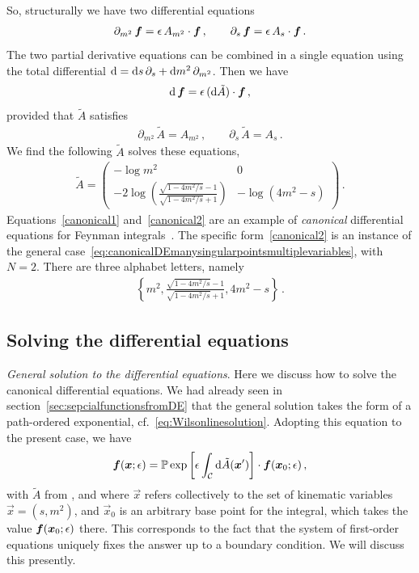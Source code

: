 So, structurally we have two differential equations 
\begin{align}
\partial_{m^2} \, \vec{f} = \eps\, A_{m^2} \cdot \vec{f} \,, \qquad
\partial_s \, \vec{f} = \eps\, A_{s} \cdot \vec{f} \,.
\end{align}
The two partial derivative equations can be combined in a single equation using the total differential $\mathrm{d} = \mathrm{d} s \, \partial_s + \mathrm{d}{m^2} \, \partial_{m^2}$.
Then we have
\begin{align}\label{canonical1}
\d \, \vec{f} =  \eps\,  (\d \tilde{A}) \cdot \vec{f} \,,
\end{align}
provided that $\tilde{A}$ satisfies
\begin{align}
\partial_{m^2} \, \tilde{A} = A_{m^2}  \,, \qquad
\partial_s \, \tilde{A} = A_{s}  \,.
\end{align}
We find the following $\tilde{A}$ solves these equations,
\begin{align}\label{canonical2}
\tilde{A} =   \begin{pmatrix}
-\log m^2 & 0 \\
-2 \log\left( \frac{\sqrt{1-4 m^2/s}-1}{ \sqrt{1-4 m^2/s} +1 } \right)  & - \log( 4 m^2-s )    
\end{pmatrix}  \,.
\end{align}
Equations~\eqref{canonical1} and~\eqref{canonical2} are an example of {\it canonical} differential equations for Feynman integrals~\cite{ch4Henn:2013pwa}.
The specific form~\eqref{canonical2} is an instance of the general case~\eqref{eq:canonicalDEmanysingularpointsmultiplevariables}, with $N=2$.
There are three alphabet letters, namely
\begin{align}\label{eq:alphabetbubble}
    \left\{ m^2, \frac{\sqrt{1-4 m^2/s}-1}{ \sqrt{1-4 m^2/s} +1 }, 4m^2-s \right\} \,.
\end{align}



\subsection{Solving the differential equations}
\label{subsec:solvingDE}

{\it General solution to the differential equations}.
Here we discuss how to solve the canonical differential equations.
We had already seen in section~\ref{sec:sepcialfunctionsfromDE} that the general solution takes the form of a path-ordered exponential, cf.~\eqref{eq:Wilsonlinesolution}. Adopting this equation to the present case, we have 
\begin{align}\label{eq:Wilsonlinesolutionbubble}
\vec{f}(\vec{x};\eps)  = {\mathbb P}\exp \left[\eps \int_{\cal C} \d \tilde{A}(\vec{x}') \right]  \cdot \vec{f}(\vec{x}_0;\eps) \,,
\end{align}
with $\tilde{A}$ from , and where $\vec{x}$ refers collectively to the set of kinematic variables $\vec{x}=(s,m^2)$, and $\vec{x}_0$ is an arbitrary base point for the integral, which takes the value $\vec{f}(\vec{x}_0;\eps)$ there. This corresponds to the fact that the system of first-order equations uniquely fixes the answer up to a boundary condition. We will discuss this presently.

